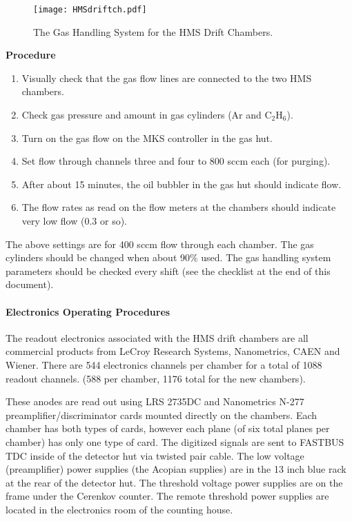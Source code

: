 \begin{figure}
\texttt{[image: HMSdriftch.pdf]}
\caption{The Gas Handling System for the HMS Drift Chambers. \label{fig:5.1}}
\end{figure}

\begin{center}
{\bf Procedure}
\end{center}

\begin{enumerate}
\item {Visually check that the gas flow lines are connected to the two
HMS chambers.}
\item {Check gas pressure and amount in gas cylinders (Ar and C$_2$H$_6$).}
\item {Turn on the gas flow on the MKS controller in the gas hut.}
\item {Set flow through channels three and four to 800 sccm each
(for purging).}
\item {After about 15 minutes, the oil bubbler in the gas hut should
indicate flow.}
\item {The flow rates as read on the flow meters at the chambers should
indicate very low flow (0.3 or so).}
\end{enumerate}

The above settings are for 400 sccm flow through each chamber.  The gas
cylinders should be changed when about 90\% used.  The gas handling system
parameters should be checked every shift (see the checklist at the end of
this document).

\paragraph{Electronics Operating Procedures}

The readout electronics associated with the HMS drift chambers are all
commercial products from LeCroy Research Systems, Nanometrics, CAEN
and Wiener.  There are 544 electronics channels per chamber for
a total of 1088 readout channels.  (588 per chamber, 1176 total
for the new chambers).

These anodes are read out using LRS 2735DC
and Nanometrics N-277 preamplifier/discriminator cards mounted directly
on the chambers.  Each chamber has both types of cards, however each plane
(of six total planes per chamber) has only one type of card.  The
digitized signals are sent to FASTBUS TDC inside of the detector hut
via twisted pair cable.  The low voltage (preamplifier) power supplies
(the Acopian supplies)
are in the 13 inch blue rack at the rear of the detector hut.  The
threshold voltage power supplies are on the frame under the Cerenkov
counter.  The remote
threshold power supplies are located in the electronics room of the counting
house.

